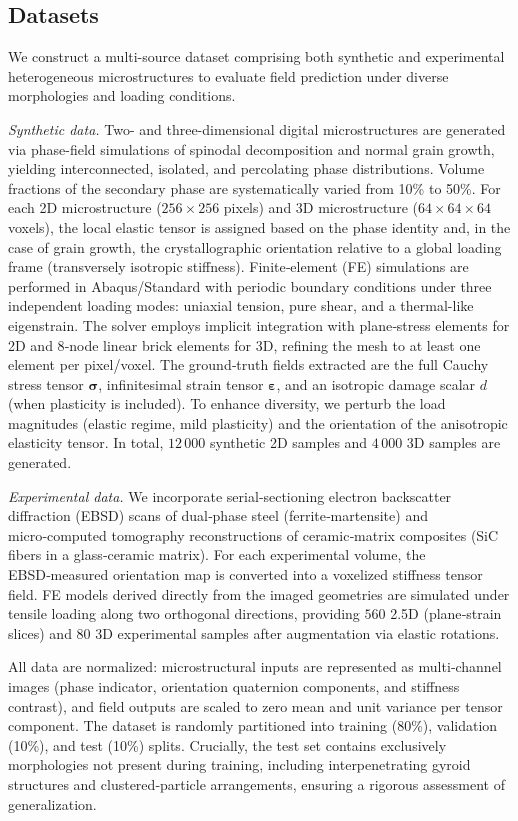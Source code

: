 \documentclass{article}
\begin{document}
\subsection{Datasets}
We construct a multi-source dataset comprising both synthetic and experimental heterogeneous microstructures to evaluate field prediction under diverse morphologies and loading conditions.

\textit{Synthetic data.} Two- and three-dimensional digital microstructures are generated via phase-field simulations of spinodal decomposition and normal grain growth, yielding interconnected, isolated, and percolating phase distributions. Volume fractions of the secondary phase are systematically varied from 10\% to 50\%. For each 2D microstructure ($256\times256$ pixels) and 3D microstructure ($64\times64\times64$ voxels), the local elastic tensor is assigned based on the phase identity and, in the case of grain growth, the crystallographic orientation relative to a global loading frame (transversely isotropic stiffness). Finite‑element (FE) simulations are performed in Abaqus/Standard with periodic boundary conditions under three independent loading modes: uniaxial tension, pure shear, and a thermal-like eigenstrain. The solver employs implicit integration with plane‑stress elements for 2D and 8‑node linear brick elements for 3D, refining the mesh to at least one element per pixel/voxel. The ground‑truth fields extracted are the full Cauchy stress tensor $\boldsymbol{\sigma}$, infinitesimal strain tensor $\boldsymbol{\varepsilon}$, and an isotropic damage scalar $d$ (when plasticity is included). To enhance diversity, we perturb the load magnitudes (elastic regime, mild plasticity) and the orientation of the anisotropic elasticity tensor. In total, $12\,000$ synthetic 2D samples and $4\,000$ 3D samples are generated.

\textit{Experimental data.} We incorporate serial‑sectioning electron backscatter diffraction (EBSD) scans of dual‑phase steel (ferrite‑martensite) and micro‑computed tomography reconstructions of ceramic‑matrix composites (SiC fibers in a glass‑ceramic matrix). For each experimental volume, the EBSD‑measured orientation map is converted into a voxelized stiffness tensor field. FE models derived directly from the imaged geometries are simulated under tensile loading along two orthogonal directions, providing $560$ 2.5D (plane‑strain slices) and $80$ 3D experimental samples after augmentation via elastic rotations.

All data are normalized: microstructural inputs are represented as multi‑channel images (phase indicator, orientation quaternion components, and stiffness contrast), and field outputs are scaled to zero mean and unit variance per tensor component. The dataset is randomly partitioned into training (80\%), validation (10\%), and test (10\%) splits. Crucially, the test set contains exclusively morphologies not present during training, including interpenetrating gyroid structures and clustered‑particle arrangements, ensuring a rigorous assessment of generalization.
\end{document}
